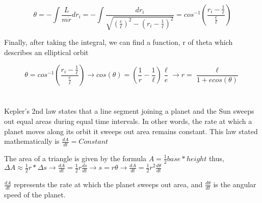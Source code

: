 \documentclass{article}
\begin{document}
$$\theta = -\int \frac{L}{m \dot{r}} dr_i = -\int \frac{dr_i}{\sqrt{(\frac{e}{\ell})^2 - (r_i-\frac{1}{\ell})^2}} = cos^{-1}(\frac{r_i - \frac{1}{\ell}}{\frac{e}{\ell}})$$

Finally, after taking the integral, we can find a function, r of theta which describes an elliptical orbit

$$ \theta = cos^{-1}(\frac{r_i - \frac{1}{\ell}}{\frac{e}{\ell}}) \rightarrow cos(\theta) = (\frac{1}{r} - \frac{1}{\ell}) \frac{\ell}{e} \rightarrow r = \frac{\ell}{1 + e cos(\theta)}$$

\section*{}

Kepler's 2nd law states that a line segment joining a planet and the Sun sweeps out equal areas during equal time intervals. In other words, the rate at which a planet moves along its orbit it sweeps out area remains constant. This law stated mathematically is $\frac{dA}{dt} = Constant$ \newline

\begin{center}
\end{center}


\newline

The area of a triangle is given by the formula $A = \frac{1}{2} base * height$ thus, $\Delta A \approx \frac{1}{2} r * \Delta s \rightarrow \frac{dA}{dt} = \frac{1}{2} r \frac{ds}{dt} \rightarrow s = r \theta \rightarrow \frac{dA}{dt} = \frac{1}{2} r^2 \frac{d\theta}{dt}$ \newline

$\frac{dA}{dt}$ represents the rate at which the planet sweeps out area, and $\frac{d\theta}{dt}$ is the angular speed of the planet. \newline
\end{document}
